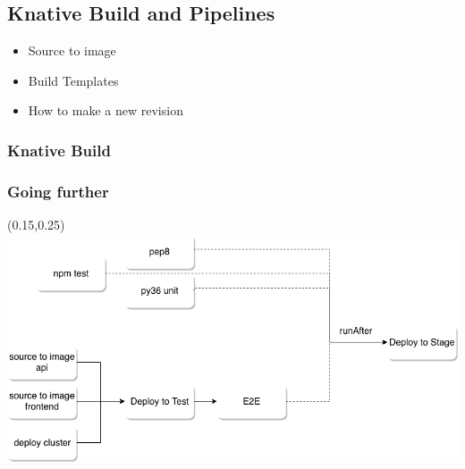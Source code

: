 \documentclass[aspectratio=169,11pt,hyperref={colorlinks=true}]{beamer}
\begin{document}
\begin{lblackrwhiteframe}
\begin{lblackrwhiteframe}

\section{Knative Build and Pipelines}

\begin{2columnsframe}
  {
  \begin{itemize}
    \item Source to image
    \item Build Templates
    \item How to make a new revision
  \end{itemize}
  }
  {
  
  }
  \frametitle{Knative Build}
\end{2columnsframe}

\begin{tblackbgrayframe}
  \frametitle{Going further}
  \begin{textblock*}{0.75\paperwidth}(0.15\paperwidth,0.25\paperheight)
    \includegraphics[width=0.75\paperwidth]{img/test-pipeline.png}
  \end{textblock*}
\end{tblackbgrayframe}


\end{lblackrwhiteframe}
\end{lblackrwhiteframe}
\end{document}
